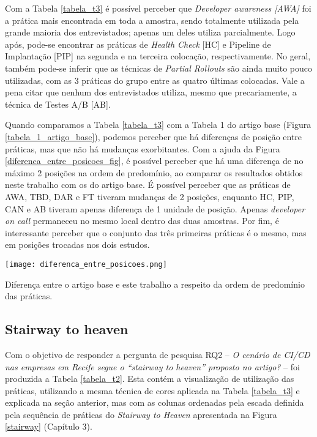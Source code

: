 Com a Tabela \ref{tabela_t3} é possível perceber que \emph{Developer awareness [AWA]} foi a prática mais encontrada em toda a amostra, sendo totalmente utilizada pela grande maioria dos entrevistados; apenas um deles utiliza parcialmente. Logo após, pode-se encontrar as práticas de \emph{Health Check} [HC] e Pipeline de Implantação [PIP]  na segunda e na terceira colocação, respectivamente. No geral, também pode-se inferir que as técnicas de \emph{Partial Rollouts} são ainda muito pouco utilizadas, com as 3 práticas do grupo entre as quatro últimas colocadas. Vale a pena citar que nenhum dos entrevistados utiliza, mesmo que precariamente, a técnica de Testes A/B [AB].

Quando comparamos a Tabela \ref{tabela_t3} com a Tabela 1 do artigo base (Figura \ref{tabela_1_artigo_base}), podemos perceber que há diferenças de posição entre práticas, mas que não há mudanças exorbitantes. Com a ajuda da Figura \ref{diferenca_entre_posicoes_fig}, é possível perceber que há uma diferença de no máximo 2 posições na ordem de predomínio, ao comparar os resultados obtidos neste trabalho com os do artigo base. É possível perceber que as práticas de AWA, TBD, DAR e FT tiveram mudanças de 2 posições, enquanto HC, PIP, CAN e AB tiveram apenas diferença de 1 unidade de posição. Apenas \emph{developer on call} permaneceu no mesmo local dentro das duas amostras. Por fim, é interessante perceber que o conjunto das três primeiras práticas é o mesmo, mas em posições trocadas nos dois estudos.

\begin{table}[ht]
\begin{center}
\texttt{[image: diferenca\_entre\_posicoes.png]}
\end{center}
\caption[Diferença entre a ordem de predomínio das práticas]{
    Diferença entre o artigo base e este trabalho a respeito da ordem de predomínio das práticas.
}\label{diferenca_entre_posicoes_fig}
\end{table}

\subsection{Stairway to heaven}

Com o objetivo de responder a pergunta de pesquisa RQ2 -- \emph{O cenário de CI/CD nas empresas em Recife segue o ``stairway to heaven'' proposto no artigo?} -- foi produzida a Tabela \ref{tabela_t2}. Esta contém a visualização de utilização das práticas, utilizando a mesma técnica de cores aplicada na Tabela \ref{tabela_t3} e explicada na seção anterior, mas com as colunas ordenadas pela escada definida pela sequência de práticas do \emph{Stairway to Heaven} apresentada na Figura \ref{stairway} (Capítulo 3).

